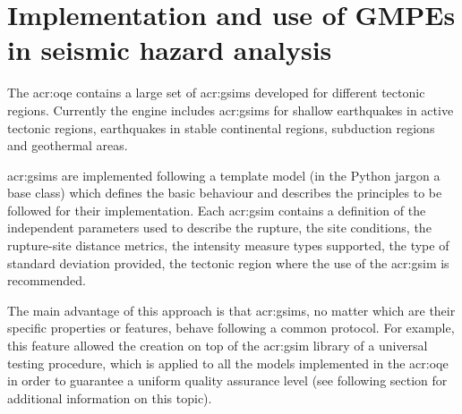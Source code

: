%
\section{Implementation and use of GMPEs in seismic hazard analysis}
The \gls{acr:oqe} contains a large set of \glspl{acr:gsim}
developed for different tectonic regions. 
%
Currently the engine includes \glspl{acr:gsim} for shallow earthquakes
in active tectonic regions, earthquakes in stable continental regions,
subduction regions and geothermal areas.

\glspl{acr:gsim} are implemented following a template model (in the 
Python jargon a base class) which defines the basic behaviour and 
describes the principles to be followed for their implementation.
%
Each \gls{acr:gsim} contains a definition of the independent parameters
used to describe the rupture, the site conditions, the rupture-site
distance metrics, the intensity measure types supported, the type of 
standard deviation provided, the tectonic region where the use of the 
\gls{acr:gsim} is recommended.

The main advantage of this approach is that \glspl{acr:gsim}, no matter 
which are their specific properties or features, behave following 
a common protocol. 
%
For example, this feature allowed the creation on top of the 
\gls{acr:gsim} library of a universal testing procedure, which is
applied to all the models implemented in the \gls{acr:oqe} in order to  
guarantee a uniform quality assurance level (see following section for
additional information on this topic). 

